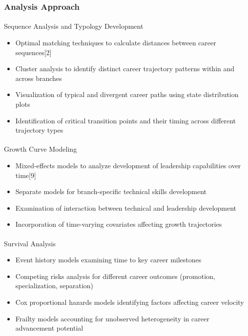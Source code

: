 \documentclass[
  letterpaper,
  DIV=11,
  numbers=noendperiod]{scrartcl}
\makeatletter
\let\oldparagraph\paragraph
\renewcommand{\paragraph}{
    \@ifstar
      \xxxParagraphStar
      \xxxParagraphNoStar
  }
\newcommand{\xxxParagraphStar}[1]{\oldparagraph*{#1}\mbox{}}
\newcommand{\xxxParagraphNoStar}[1]{\oldparagraph{#1}\mbox{}}
\providecommand{\tightlist}{%
  \setlength{\itemsep}{0pt}\setlength{\parskip}{0pt}}
\makeatother
\begin{document}
\subsubsection{Analysis Approach}\label{analysis-approach}

\paragraph{Sequence Analysis and Typology
Development}\label{sequence-analysis-and-typology-development}

\begin{itemize}
\tightlist
\item
  Optimal matching techniques to calculate distances between career
  sequences{[}2{]}
\item
  Cluster analysis to identify distinct career trajectory patterns
  within and across branches
\item
  Visualization of typical and divergent career paths using state
  distribution plots
\item
  Identification of critical transition points and their timing across
  different trajectory types
\end{itemize}

\paragraph{Growth Curve Modeling}\label{growth-curve-modeling}

\begin{itemize}
\tightlist
\item
  Mixed-effects models to analyze development of leadership capabilities
  over time{[}9{]}
\item
  Separate models for branch-specific technical skills development
\item
  Examination of interaction between technical and leadership
  development
\item
  Incorporation of time-varying covariates affecting growth trajectories
\end{itemize}

\paragraph{Survival Analysis}\label{survival-analysis}

\begin{itemize}
\tightlist
\item
  Event history models examining time to key career milestones
\item
  Competing risks analysis for different career outcomes (promotion,
  specialization, separation)
\item
  Cox proportional hazards models identifying factors affecting career
  velocity
\item
  Frailty models accounting for unobserved heterogeneity in career
  advancement potential
\end{itemize}
\end{document}
